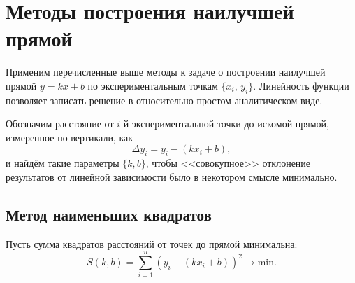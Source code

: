 %
%

\section{Методы построения наилучшей прямой}
Применим перечисленные выше методы к задаче о построении наилучшей прямой
$y=kx+b$ по экспериментальным точкам $\{x_i,\,y_i\}$.
Линейность функции позволяет записать решение в относительно
простом аналитическом виде.

Обозначим расстояние от $i$-й экспериментальной точки до искомой прямой,
измеренное по вертикали, как
\[
\Delta y_{i}=y_{i}-\left(kx_{i}+b\right),
\]
и найдём такие параметры $\{k,b\}$, чтобы <<совокупное>> отклонение
результатов от линейной зависимости было в некотором смысле минимально.

\subsection{Метод наименьших квадратов}\label{sec:MNK}
\label{sec:linear}
Пусть сумма квадратов расстояний от точек до прямой минимальна:
\begin{equation}\label{eq:mnk_S}
S\!\left(k,b\right)=
\sum\limits _{i=1}^{n}(y_i-(kx_i+b))^{2}\to\mathrm{min}.
\end{equation}

